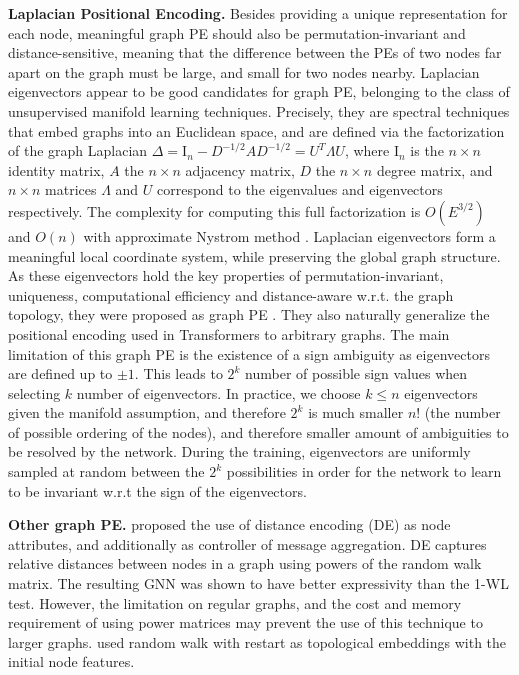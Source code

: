 \documentclass{article} \usepackage{iclr2021_conference,times}
\begin{document}
{\bf Laplacian Positional Encoding.} Besides providing a unique representation for each node, meaningful graph PE should also be  permutation-invariant and distance-sensitive, meaning that the difference between the PEs of two nodes far apart on the graph must be large, and small for two nodes nearby. Laplacian eigenvectors \citep{belkin2003laplacian} appear to be good candidates for graph PE, belonging to the class of unsupervised manifold learning techniques. Precisely, they are spectral techniques that embed graphs into an Euclidean space, and are defined via the factorization of the graph Laplacian $\Delta=\textrm{I}_n-D^{-1/2}AD^{-1/2}=U^T\Lambda U$,  
where $\textrm{I}_n$ is the $n\times n$ identity matrix, $A$ the $n\times n$ adjacency matrix, $D$ the $n\times n$ degree matrix, and $n\times n$ matrices $\Lambda$ and $U$ correspond to the eigenvalues and eigenvectors respectively. The complexity for computing this full factorization is $O(E^{3/2})$ and $O(n)$ with approximate Nystrom method \citep{fowlkes2004spectral}. Laplacian eigenvectors form a meaningful local coordinate system, while preserving the global graph structure. As these eigenvectors hold the key properties of permutation-invariant, uniqueness, computational efficiency and distance-aware w.r.t. the graph topology, they were proposed as graph PE \citep{dwivedi2020benchmarking,dwivedi2021generalization}. They also naturally generalize the positional encoding used in  Transformers \citep{vaswani2017attention} to arbitrary graphs. The main limitation of this graph PE is the existence of a sign ambiguity as eigenvectors are defined up to $\pm 1$. This leads to $2^k$ number of possible sign values when selecting $k$ number of eigenvectors. In practice, we choose $k\leq n$ eigenvectors given the manifold assumption, and therefore $2^k$ is much smaller $n!$ (the number of possible ordering of the nodes), and therefore smaller amount of ambiguities to be resolved by the network. During the training, eigenvectors are uniformly sampled at random between the $2^k$ possibilities \citep{dwivedi2020benchmarking, kreuzer2021rethinking} in order for the network to learn to be invariant w.r.t the sign of the eigenvectors.


{\bf Other graph PE.} \cite{li2020distance} proposed the use of distance encoding (DE) as node attributes, and additionally as controller of message aggregation. DE captures relative distances between nodes in a graph using powers of the random walk matrix. The resulting GNN was shown to have better expressivity than the 1-WL test. However, the limitation on regular graphs, and the cost and memory requirement of using power matrices may prevent the use of this technique to larger graphs. \cite{Khasahmadi2020Memory-Based} used random walk with restart \citep{pan2004automatic} as topological embeddings with the initial node features.
\end{document}
